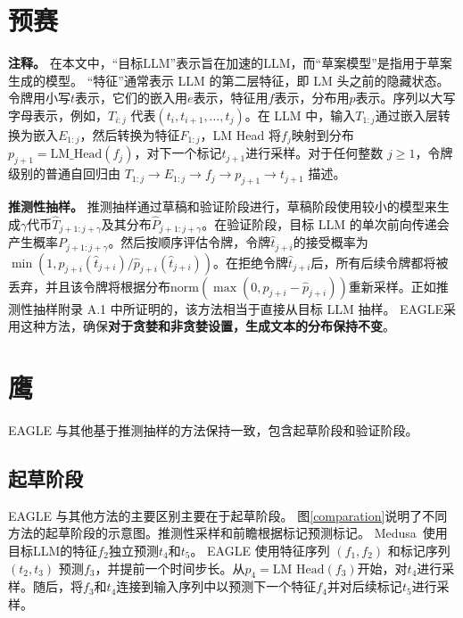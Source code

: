 \documentclass{article}
\theoremstyle{plain}
\theoremstyle{definition}
\theoremstyle{remark}
\begin{document}
\section{预赛}


\textbf{注释。} 在本文中，“目标LLM”表示旨在加速的LLM，而“草案模型”是指用于草案生成的模型。 “特征”通常表示 LLM 的第二层特征，即 LM 头之前的隐藏状态。令牌用小写$t$表示，它们的嵌入用$e$表示，特征用$f$表示，分布用$p$表示。序列以大写字母表示，例如，$T_{i:j}$ 代表$(t_i,t_{i+1},\ldots,t_{j})$。在 LLM 中，输入$T_{1:j}$通过嵌入层转换为嵌入$E_{1:j}$，然后转换为特征$F_{1:j}$，LM Head 将$f_{j}$映射到分布$p_{j+1}=\text{LM\_Head}(f_{j})$，对下一个标记$t_{j+1}$进行采样。对于任何整数 $j\ge 1$，令牌级别的普通自回归由 $T_{1:j}\rightarrow E_{1:j}\rightarrow f_j\rightarrow p_{j+1}\rightarrow t_{j+1}$ 描述。

\textbf{推测性抽样。} 
推测抽样通过草稿和验证阶段进行，草稿阶段使用较小的模型来生成$\gamma$代币$\hat{T}_{j+1:j+\gamma}$及其分布$\hat{P}_{j+1:j+\gamma}$。在验证阶段，目标 LLM 的单次前向传递会产生概率$P_{j+1:j+\gamma}$。然后按顺序评估令牌，令牌$\hat{t}_{j+i}$的接受概率为$\min(1,p_{j+i}(\hat{t}_{j+i})/\hat{p}_{j+i}(\hat{t}_{j+i}))$。在拒绝令牌$\hat{t}_{j+i}$后，所有后续令牌都将被丢弃，并且该令牌将根据分布$\text{norm}(\max(0,p_{j+i}-\hat{p}_{j+i}))$重新采样。正如推测性抽样\cite{leviathan2023fast}附录 A.1 中所证明的，该方法相当于直接从目标 LLM 抽样。 EAGLE采用这种方法，确保\textbf{对于贪婪和非贪婪设置，生成文本的分布保持不变}。


\section{鹰}

EAGLE 与其他基于推测抽样的方法保持一致，包含起草阶段和验证阶段。



\subsection{起草阶段}
\label{me:draft}


EAGLE 与其他方法的主要区别主要在于起草阶段。
图\ref{comparation}说明了不同方法的起草阶段的示意图。推测性采样\cite{leviathan2023fast,chen2023accelerating}和前瞻\cite{fu2023lookahead}根据标记预测标记。 Medusa~\cite{medusa}使用目标LLM的特征$f_2$独立预测$t_4$和$t_5$。 EAGLE 使用特征序列 $(f_1,f_2)$ 和标记序列 $(t_2,t_3)$ 预测$f_3$，并提前一个时间步长。从$p_4=\text{LM Head}(f_3)$开始，对$t_4$进行采样。随后，将$f_3$和$t_4$连接到输入序列中以预测下一个特征$f_4$并对后续标记$t_5$进行采样。
\end{document}
